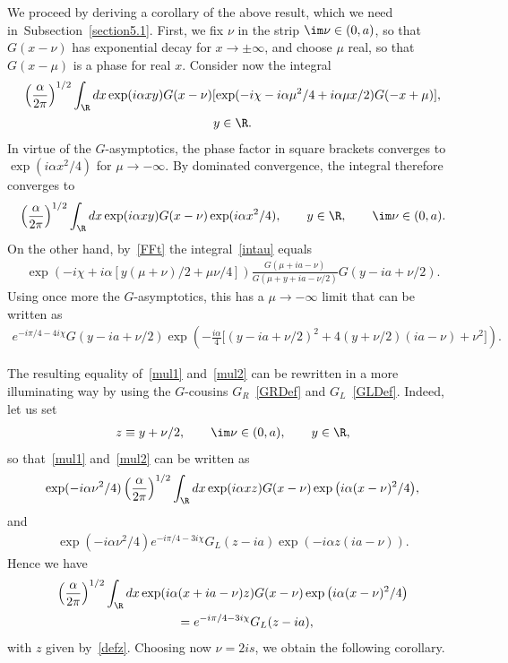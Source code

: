\documentclass[pdftex]{sigma}
\numberwithin{equation}{section}
\begin{document}
We proceed by deriving a corollary of the above result, which we need in~Subsection~\ref{section5.1}. First, we f\/ix $\nu$ in the strip $\im\nu\in(0,a)$, so that $G(x-\nu)$ has exponential decay for $x\to\pm\infty$, and choose $\mu$ real, so that $G(x-\mu)$ is a phase for real $x$. Consider now the integral
\begin{gather}\label{intau}
\left(\frac{\alpha}{2\pi}\right)^{1/2}\int_{\R}dx \exp(i\alpha xy)G(x-\nu)[\exp(-i\chi -i\alpha \mu^2/4+i\alpha\mu x/2)G(-x+\mu)],\\
 y\in\R. \nonumber
\end{gather}
In virtue of the $G$-asymptotics, the phase factor in square brackets converges to $\exp(i\alpha x^2/4)$ for $\mu\to -\infty$. By dominated convergence, the integral therefore converges to
\begin{gather}\label{mul1}
\left(\frac{\alpha}{2\pi}\right)^{1/2}\int_{\R}dx \exp(i\alpha xy)G(x-\nu)\exp(i\alpha x^2/4),\qquad  y\in\R ,\qquad \im\nu\in(0,a).
\end{gather}
On the other hand, by~\eqref{FFt} the integral~\eqref{intau} equals
\begin{gather}
\exp(-i\chi+i\alpha [y(\mu+\nu)/2+\mu\nu/4])\frac{G(\mu +ia-\nu)}{G(\mu+y+ia-\nu/2)}G(y-ia+\nu/2).
\end{gather}
Using once more the $G$-asymptotics, this has a $\mu\to -\infty$ limit that can be written as
\begin{gather}\label{mul2}
e^{-i\pi/4-4i\chi}G(y-ia+\nu/2)\exp\left( -\frac{i\alpha}{4}\big[(y-ia+\nu/2)^2+4(y+\nu/2)(ia-\nu)+\nu^2\big]\right).\!\!\!
\end{gather}

The resulting equality of~\eqref{mul1} and~\eqref{mul2} can be rewritten in a more illuminating way by using the $G$-cousins $G_R$~\eqref{GRDef} and $G_L$~\eqref{GLDef}. Indeed, let us set
\begin{gather}\label{defz}
z\equiv y+\nu/2,\qquad \im \nu\in(0,a),\qquad y\in\R,
\end{gather}
so that~\eqref{mul1} and~\eqref{mul2} can be written as
\begin{gather}
\exp(-i\alpha\nu^2/4)\left(\frac{\alpha}{2\pi}\right)^{1/2}\int_{\R}dx \exp(i\alpha xz)G(x-\nu)\exp\big(i\alpha (x-\nu)^2/4\big),
\end{gather}
and
\begin{gather}
\exp(-i\alpha\nu^2/4)e^{-i\pi/4-3i\chi}G_L(z-ia)\exp( -i\alpha z(ia-\nu)).
\end{gather}
Hence we have
\begin{gather}
\left(\frac{\alpha}{2\pi}\right)^{1/2}\int_{\R}dx \exp(i\alpha (x+ia-\nu)z)G(x-\nu)\exp\big(i\alpha (x-\nu)^2/4\big)\nonumber\\
\qquad{}
=e^{-i\pi/4-3i\chi}G_L(z-ia),
\end{gather}
with $z$ given by~\eqref{defz}. Choosing now $\nu =2is$,
we obtain the following corollary.
\end{document}
